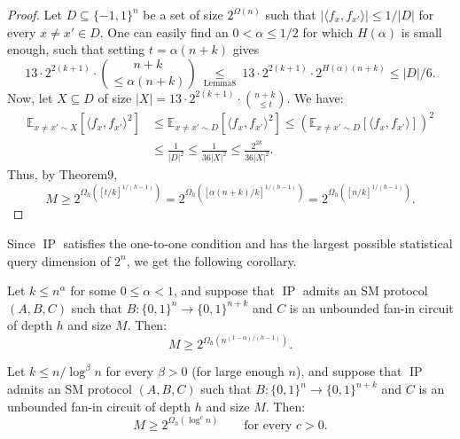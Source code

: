 \begin{proof}
Let $D\subseteq\{-1,1\}^n$ be a set of size $2^{\Omega(n)}$ such that $|\langle f_x,f_{x'}\rangle|\leq1/|D|$ for every $x\ne x'\in D$. One can easily find an $0<\alpha\leq1/2$ for which $H(\alpha)$ is small enough, such that setting $t=\alpha(n+k)$ gives
\[13\cdot2^{2(k+1)}\cdot\binom{n+k}{\leq\alpha(n+k)}\ \underset{\text{Lemma8}}\leq\ 13\cdot2^{2(k+1)}\cdot2^{H(\alpha)(n+k)}\leq|D|/6.\]
Now, let $X\subseteq D$ of size $|X|=13\cdot2^{2(k+1)}\cdot\binom{n+k}{\leq t}$. We have:
\begin{align*}\mathbb E_{x\ne x'\sim X}[\langle f_x,f_{x'}\rangle^2]&\leq\mathbb E_{x\ne x'\sim D}[\langle f_x,f_{x'}\rangle^2]\leq\left(\mathbb E_{x\ne x'\sim D}[\langle f_x,f_{x'}\rangle]\right)^2\\&\leq\frac1{|D|^2}\leq\frac1{36|X|^2}\leq\frac{2^{2k}}{36|X|^2}.\end{align*}
Thus, by Theorem9,
\[M\geq2^{\Omega_h([t/k]^{1/(h-1)})}=2^{\Omega_h([\alpha(n+k)/k]^{1/(h-1)})}=2^{\Omega_h([n/k]^{1/(h-1)})}.\]
\end{proof}
Since $\operatorname{IP}$ satisfies the one-to-one condition and has the largest possible statistical query dimension of $2^n$, we get the following corollary.
\begin{ntcorollary}
Let $k\leq n^\alpha$ for some $0\leq\alpha<1$, and suppose that $\operatorname{IP}$ admits an SM protocol $(A,B,C)$ such that $B:\{0,1\}^n\to\{0,1\}^{n+k}$ and $C$ is an unbounded fan-in circuit of depth $h$ and size $M$. Then:
\[M\geq2^{\Omega_h(n^{(1-\alpha)/(h-1)})}.\]
\end{ntcorollary}
\begin{ntcorollary}
Let $k\leq n/\log^\beta n$ for every $\beta>0$ (for large enough $n$), and suppose that $\operatorname{IP}$ admits an SM protocol $(A,B,C)$ such that $B:\{0,1\}^n\to\{0,1\}^{n+k}$ and $C$ is an unbounded fan-in circuit of depth $h$ and size $M$. Then:
\[M\geq2^{\Omega_h(\log^c n)}\qquad\text{for every }c>0.\]
\end{ntcorollary}
